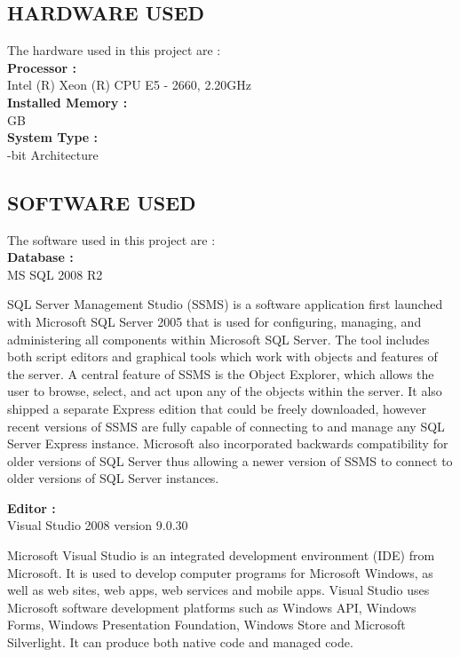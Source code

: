 \documentclass[14pt]{article} %
\begin{document}
\subsection{HARDWARE USED}
\noindent The hardware used in this project are :\\
\textbf{Processor : } \\
\indent Intel (R) Xeon (R) CPU E5 - 2660, 2.20GHz\\
\textbf{Installed Memory : }\\
 GB\\
 \textbf{System Type : }\\
 -bit Architecture
 
 \subsection{SOFTWARE USED}
 \noindent The software used in this project are :\\
\indent \textbf{Database :}\\
\indent MS SQL 2008 R2 \\ \par
  SQL Server Management Studio (SSMS) is a software application first launched with Microsoft SQL Server 2005 that is used for configuring, managing, and administering all components within Microsoft SQL Server. The tool includes both script editors and graphical tools which work with objects and features of the server.
A central feature of SSMS is the Object Explorer, which allows the user to browse, select, and act upon any of the objects within the server. It also shipped a separate Express edition that could be freely downloaded, however recent versions of SSMS are fully capable of connecting to and manage any SQL Server Express instance. Microsoft also incorporated backwards compatibility for older versions of SQL Server thus allowing a newer version of SSMS to connect to older versions of SQL Server instances.\\  \par
\textbf{Editor :}\\
\indent Visual Studio 2008 version 9.0.30\\ \par
Microsoft Visual Studio is an integrated development environment (IDE) from Microsoft. It is used to develop computer programs for Microsoft Windows, as well as web sites, web apps, web services and mobile apps. Visual Studio uses Microsoft software development platforms such as Windows API, Windows Forms, Windows Presentation Foundation, Windows Store and Microsoft Silverlight. It can produce both native code and managed code.
\end{document}
